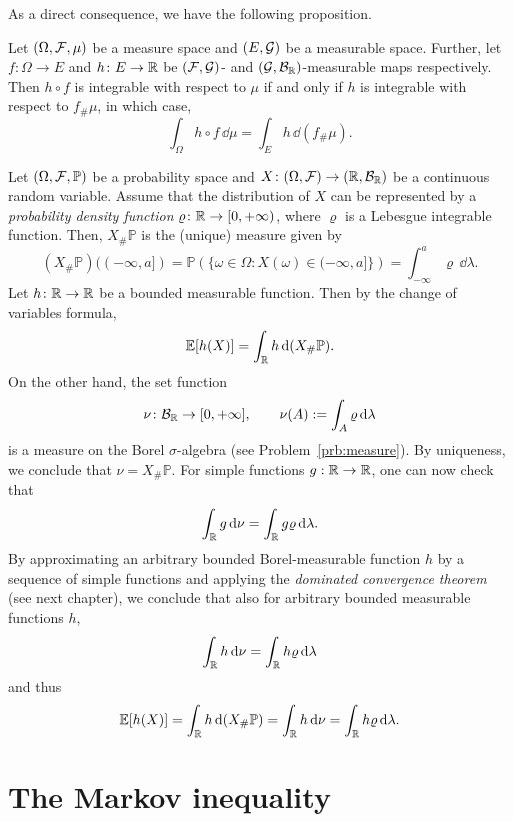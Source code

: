 \bigskip

As a direct consequence, we have the following proposition.
\begin{proposition}
Let $(\Omega, \mathcal F, \mu)$ be a measure space and $(E,\mathcal G)$ be a measurable space. Further, let $f\colon \Omega \to E$ and $h\colon E \to \mathbb R$ be $(\mathcal F,\mathcal G)$- and $(\mathcal G,\mathcal B_{\mathbb R})$-measurable maps respectively. Then $h \circ f$ is integrable with respect to $\mu$ if and only if $h$ is integrable with respect to $f_\# \mu$, in which case,
\[
\int_\Omega h \circ f\, \dd \mu = \int_E h \, \dd (f_\# \mu).
\]
\end{proposition}

\begin{example}
Let $(\Omega, \mathcal F, \mathbb{P})$ be a probability space and $X\colon (\Omega, \mathcal F) \to (\mathbb R, \mathcal B_{\mathbb R})$ be a continuous random variable. Assume that the distribution of $X$ can be represented by a \emph{probability density function} $\varrho\colon \mathbb R \to [0,+\infty)$, where $\varrho$ is a Lebesgue integrable function. Then, $X_\# \mathbb{P}$ is the (unique) measure given by
\[
(X_\# \mathbb{P})((-\infty,a]) =\mathbb{P}\left(\bigl\{ \omega \in \Omega : X(\omega) \in (-\infty,a]\bigr\} \right) = 
\int_{-\infty}^a \varrho \, \dd \lambda.
\]	
Let $h\colon \mathbb R \to \mathbb R$ be a bounded measurable function. Then by the change of variables formula,
\[
	\mathbb{E}[h(X)] = \int_{\mathbb R} h \, \mathrm{d} (X_\# \mathbb{P}).
\]
On the other hand, the set function
\[
	\nu\colon \mathcal B_{\mathbb R} \to [0,+\infty],\qquad\nu(A) := \int_A \varrho\, \mathrm{d} \lambda
\]
is a measure on the Borel $\sigma$-algebra (see Problem~\ref{prb:measure}). By uniqueness, we conclude that $\nu = X_\# \mathbb{P}$. For simple functions $g:\mathbb R \to \mathbb R$, one can now check that
\[
\int_{\mathbb R} g\, \mathrm{d} \nu = \int_{\mathbb R} g \varrho\, \mathrm{d} \lambda.
\]
By approximating an arbitrary bounded Borel-measurable function $h$ by a sequence of simple functions and applying the \emph{dominated convergence theorem} (see next chapter), we conclude that also for arbitrary bounded measurable functions $h$,
\[
\int_{\mathbb R} h\, \mathrm{d} \nu = \int_{\mathbb R} h \varrho\, \mathrm{d} \lambda
\]
and thus
\[
\mathbb{E}[h(X)] = \int_{\mathbb R} h \, \mathrm{d} (X_\# \mathbb{P}) = \int_{\mathbb R} h \, \mathrm{d} \nu = \int_{\mathbb R} h \varrho \, \mathrm{d} \lambda.
\]
\end{example}


\section{The Markov inequality}

